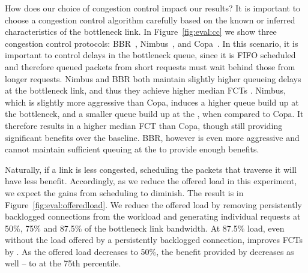  How does our choice of congestion control impact our results? 
It is important to choose a congestion control algorithm carefully based on the known or inferred characteristics of the bottleneck link. 
In Figure~\ref{fig:eval:cc} we show three congestion control protocols: BBR~\cite{bbr}, Nimbus~\cite{nimbus}, and Copa~\cite{copa}.
In this scenario, it is important to control delays in the bottleneck queue, since it is FIFO scheduled and therefore queued packets from short requests must wait behind those from longer requests. Nimbus and BBR both maintain slightly higher queueing delays at the bottleneck link, and thus they achieve higher median FCTs . 
Nimbus, which is slightly more aggressive than Copa, induces a higher queue build up at the bottleneck, and a smaller queue build up at the \name, when compared to Copa. It therefore results in a higher median FCT than Copa, though still providing significant benefits over the baseline. BBR, however is even more aggressive and cannot maintain sufficient queuing at the \name to provide enough benefits.






 Naturally, if a link is less congested, scheduling the packets that traverse it will have less benefit. Accordingly, as we reduce the offered load in this experiment, we expect the gains from scheduling to diminish. The result is in Figure~\ref{fig:eval:offeredload}. We reduce the offered load by removing persistently backlogged connections from the workload and generating individual requests at 50\%, 75\% and 87.5\% of the bottleneck link bandwidth. 
At 87.5\% load, even without the load offered by a persistently backlogged connection, \name improves FCTs by . 
As the offered load decreases to 50\%, the benefit provided by \name decreases as well -- to  at the 75th percentile.



